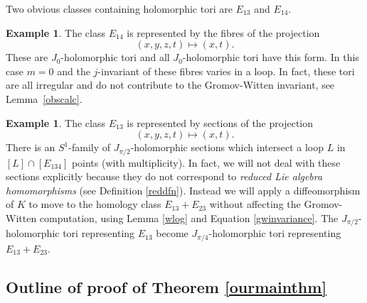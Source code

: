 \documentclass[11pt]{amsart}
\numberwithin{equation}{section}
\theoremstyle{definition}
\newtheorem{exm}[equation]{Example}
\theoremstyle{remark}
\begin{document}
Two obvious classes containing holomorphic tori are $E_{13}$ and $E_{14}$.
\begin{exm}
The class $E_{14}$ is represented by the fibres of the projection
\[(x,y,z,t)\mapsto (x,t).\]
These are $J_0$-holomorphic tori and all $J_0$-holomorphic tori have this form. In this case $m=0$ and the $j$-invariant of these fibres varies in a loop. In fact, these tori are all irregular and do not contribute to the Gromov-Witten invariant, see Lemma~\ref{obscalc}.
\end{exm}
\begin{exm}
The class $E_{13}$ is represented by sections of the projection
\[(x,y,z,t)\mapsto (x,t).\]
There is an $S^1$-family of $J_{\pi/2}$-holomorphic sections which intersect a loop $L$ in $[L]\cap [E_{134}]$ points (with multiplicity). In fact, we will not deal with these sections explicitly because they do not correspond to \emph{reduced Lie algebra homomorphisms} (see Definition \ref{reddfn}). Instead we will apply a diffeomorphism of $K$ to move to the homology class $E_{13}+E_{23}$ without affecting the Gromov-Witten computation, using Lemma \ref{wlog} and Equation \eqref{gwinvariance}. The $J_{\pi/2}$-holomorphic tori representing $E_{13}$ become $J_{\pi/4}$-holomorphic tori representing $E_{13}+E_{23}$.
\end{exm}

\subsection*{Outline of proof of Theorem \ref{ourmainthm}}
\end{document}
